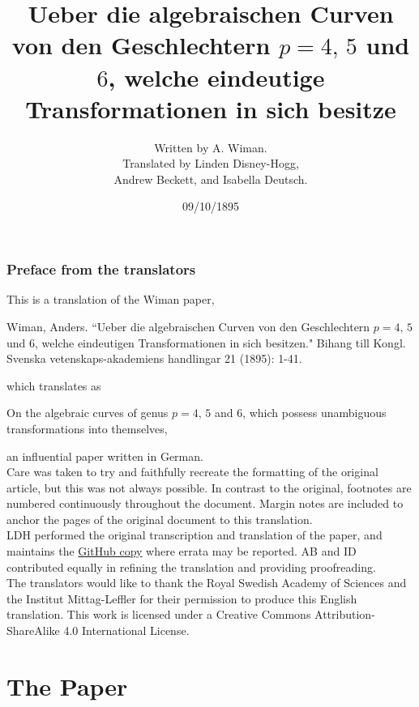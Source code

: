 \documentclass[leqno]{article}
\title{Ueber die algebraischen Curven von den Geschlechtern $p = 4, \, 5$ und $6$, welche eindeutige Transformationen in sich besitze }
\author{Written by A. Wiman. \\
Translated by Linden Disney-Hogg, \\
Andrew Beckett, and Isabella Deutsch.}
\date{09/10/1895}
\begin{document}
\maketitle

\section*{Preface from the translators}
This is a translation of the Wiman paper,
\begin{center}
	Wiman, Anders. ``Ueber die algebraischen Curven von den Geschlechtern $p= 4, \, 5$ und $6$, welche eindeutigen Transformationen in sich besitzen."  Bihang till Kongl. Svenska vetenskaps-akademiens handlingar 21 (1895): 1-41.
\end{center}
which translates as 
\begin{center}
	On the algebraic curves of genus $p=4, \, 5$ and $6$, which possess unambiguous transformations into themselves, 
\end{center}
an influential paper written in German. \\
Care was taken to try and faithfully recreate the formatting of the original article, but this was not always possible. In contrast to the original, footnotes are numbered continuously throughout the document. Margin notes are included to anchor the pages of the original document to this translation. \\
LDH performed the original transcription and translation of the paper, and maintains the \href{https://github.com/DisneyHogg/Wiman-Translation}{GitHub copy} where errata may be reported. AB and ID contributed equally in refining the translation and providing proofreading. \\
The translators would like to thank the Royal Swedish Academy of Sciences and the Institut Mittag-Leffler for their permission to produce this English translation. This work is licensed under a Creative Commons Attribution-ShareAlike 4.0 International License.
\part*{The Paper}
\end{document}
